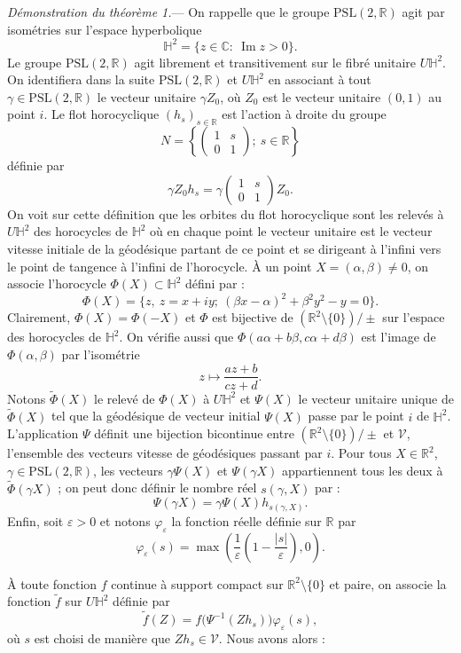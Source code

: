 \documentclass[11pt]{article}
\theoremstyle{remark}
\newcommand{\R}{\mathbb{R}}
\newcommand{\C}{\mathbb{C}}
\newcommand{\PSL}{\mathrm{PSL}}
\newcommand{\Impart}{\operatorname{Im}}
\begin{document}
\noindent\emph{Démonstration du théorème 1.}---
On rappelle que le groupe $\PSL(2,\R)$ agit par isométries sur l'espace hyperbolique
\[
\mathbb H^2=\{z\in\C:\ \Impart z>0\}.
\]
Le groupe $\PSL(2,\R)$ agit librement et transitivement sur le fibré unitaire $U\mathbb H^2$. On identifiera dans la suite $\PSL(2,\R)$ et $U\mathbb H^2$ en associant à tout $\gamma\in\PSL(2,\R)$ le vecteur unitaire $\gamma Z_0$, où $Z_0$ est le vecteur unitaire $(0,1)$ au point $i$. Le flot horocyclique $(h_s)_{s\in\R}$ est l'action à droite du groupe
\[
N=\left\{\begin{pmatrix}1&s\\0&1\end{pmatrix};\ s\in\R\right\}
\]
définie par
\[
\gamma Z_0h_s=\gamma\begin{pmatrix}1&s\\0&1\end{pmatrix}Z_0.
\]
On voit sur cette définition que les orbites du flot horocyclique sont les relevés à $U\mathbb H^2$ des horocycles de $\mathbb H^2$ où en chaque point le vecteur unitaire est le vecteur vitesse initiale de la géodésique partant de ce point et se dirigeant à l'infini vers le point de tangence à l'infini de l'horocycle. À un point $X=(\alpha,\beta)\ne0$, on associe l'horocycle $\Phi(X)\subset\mathbb H^2$ défini par :
\[
\Phi(X)=\{z,\ z=x+iy;\ (\beta x-\alpha)^2+\beta^2y^2-y=0\}.
\]
Clairement, $\Phi(X)=\Phi(-X)$ et $\Phi$ est bijective de $(\R^2\setminus\{0\})/\pm$ sur l'espace des horocycles de $\mathbb H^2$. On vérifie aussi que $\Phi(a\alpha+b\beta,c\alpha+d\beta)$ est l'image de $\Phi(\alpha,\beta)$ par l'isométrie
\[
z\longmapsto \frac{az+b}{cz+d}.
\]
Notons $\widetilde\Phi(X)$ le relevé de $\Phi(X)$ à $U\mathbb H^2$ et $\Psi(X)$ le vecteur unitaire unique de $\widetilde\Phi(X)$ tel que la géodésique de vecteur initial $\Psi(X)$ passe par le point $i$ de $\mathbb H^2$. L'application $\Psi$ définit une bijection bicontinue entre $(\R^2\setminus\{0\})/\pm$ et $\mathcal V$, l'ensemble des vecteurs vitesse de géodésiques passant par $i$. Pour tous $X\in\R^2$, $\gamma\in\PSL(2,\R)$, les vecteurs $\gamma\Psi(X)$ et $\Psi(\gamma X)$ appartiennent tous les deux à $\widetilde\Phi(\gamma X)$ ; on peut donc définir le nombre réel $s(\gamma,X)$ par :
\[
\Psi(\gamma X)=\gamma\Psi(X)h_{s(\gamma,X)}.
\]
Enfin, soit $\varepsilon>0$ et notons $\varphi_\varepsilon$ la fonction réelle définie sur $\R$ par
\[
\varphi_\varepsilon(s)=\max\left(\frac{1}{\varepsilon}\left(1-\frac{|s|}{\varepsilon}\right),0\right).
\]

À toute fonction $f$ continue à support compact sur $\R^2\setminus\{0\}$ et paire, on associe la fonction $\widetilde f$ sur $U\mathbb H^2$ définie par
\[
\widetilde f(Z)=f\bigl(\Psi^{-1}(Zh_s)\bigr)\varphi_\varepsilon(s),
\]
où $s$ est choisi de manière que $Zh_s\in\mathcal V$. Nous avons alors :
\end{document}
